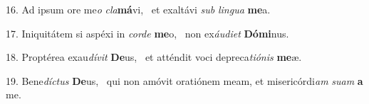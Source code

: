 16. Ad ipsum ore me\textit{o} \textit{cla}\textbf{má}vi, \ast\  et exaltávi \textit{sub} \textit{lin}\textit{gua} \textbf{me}a.\

17. Iniquitátem si aspéxi in \textit{cor}\textit{de} \textbf{me}o, \ast\  non ex\textit{áu}\textit{di}\textit{et} \textbf{Dó}\textbf{mi}nus.\

18. Proptérea exau\textit{dí}\textit{vit} \textbf{De}us, \ast\  et atténdit voci depreca\textit{ti}\textit{ó}\textit{nis} \textbf{me}æ.\

19. Bene\textit{díc}\textit{tus} \textbf{De}us, \ast\  qui non amóvit oratiónem meam, et misericórdi\textit{am} \textit{su}\textit{am} \textbf{a} me.\

